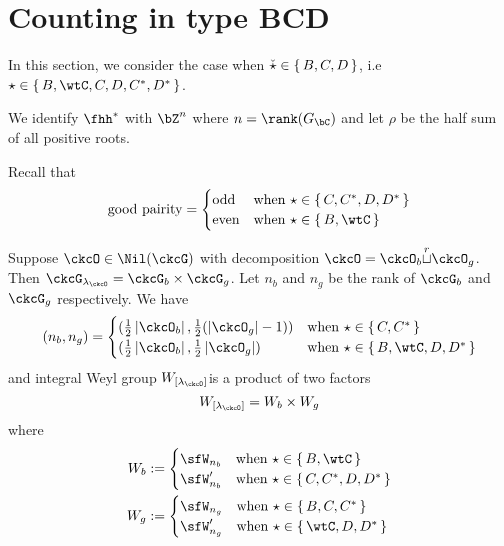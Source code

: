 \documentclass[12pt,a4paper]{amsart}
\def\abs#1{\left|{#1}\right|}
\numberwithin{equation}{section}
\theoremstyle{remark}
\def\half{{\tfrac{1}{2}}}
\def\lamck{\lambda_\ckcO}
\def\Gc{G_\bC}
\def\WLamck{W_{[\lambda_{\ckcO}]}}
\def\cuprow{{\stackrel{r}{\sqcup}}}
\def\ckstar{{\check \star}}
\begin{document}
\section{Counting in type BCD}

In this section, we consider the case when $\ckstar \in \set{B,C,D}$, i.e
$\star \in \set{B,\wtC, C,D,C^{*}, D^{*}}$.

We identify $\fhh^{*}$ with $\bZ^{n}$ where $n = \rank(\Gc)$
and let $\rho$ be the half sum of all positive roots.

Recall that
\[
  \text{good pairity} =
\begin{cases}
 \text{odd} & \text{when } \star \in \set{C,C^{*},D,D^{*}}\\
 \text{even} & \text{when } \star \in \set{B,\wtC}\\
\end{cases}
\]

\def\Wb{W_{b}}
\def\Wg{W_{g}}

  Suppose $\ckcO\in \Nil(\ckcG)$ with decomposition
  $\ckcO = \ckcO_{b}\cuprow \ckcO_{g}$.
  Then $\ckcG_{\lamck} = \ckcG_{b}\times \ckcG_{g}$.
  Let $n_{b}$ and $n_{g}$ be the rank of $\ckcG_{b}$ and $\ckcG_{g}$
  respectively. We have
  \[
    (n_{b}, n_{g}) =
    \begin{cases}
      (\half \abs{\ckcO_{b}}, \half(\abs{\ckcO_{g}}-1)) & \text{when
      } \star \in \set{C,C^{*}}\\
      (\half \abs{\ckcO_{b}}, \half\abs{\ckcO_{g}}) & \text{when
      } \star \in \set{B,\wtC,D,D^{*}}\\
    \end{cases}
  \]
  and integral Weyl group $\WLamck$is a product of two factors
  \[
    W_{[\lamck]} =\Wb\times \Wg
  \]
  where
  \begin{equation}\label{eq:Wbg}
    \begin{split}
    \Wb & := \begin{cases}
      \sfW_{n_{b}}  & \text{when } \star \in \set{B, \wtC} \\
      \sfW'_{n_{b}} & \text{when } \star \in \set{C,C^{*},D,D^{*}}
      \end{cases}\\
    \Wg & := \begin{cases}
      \sfW_{n_{g}}  & \text{when } \star \in \set{B,C, C^{*} } \\
      \sfW'_{n_{g}} & \text{when } \star \in \set{\wtC,D,D^{*}}
      \end{cases}
    \end{split}
  \end{equation}
\end{document}
